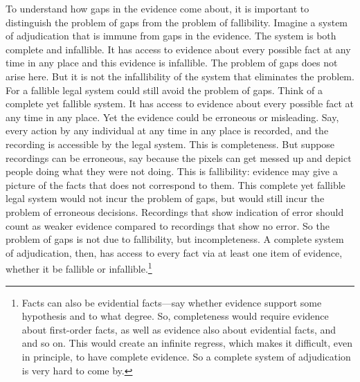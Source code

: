 \documentclass[
  10pt,
  dvipsnames,enabledeprecatedfontcommands]{scrartcl}
\begin{document}
To understand how gaps in the evidence come about, it is important to
distinguish the problem of gaps from the problem of fallibility. Imagine
a system of adjudication that is immune from gaps in the evidence. The
system is both complete and infallible. It has access to evidence about
every possible fact at any time in any place and this evidence is
infallible. The problem of gaps does not arise here. But it is not the
infallibility of the system that eliminates the problem. For a fallible
legal system could still avoid the problem of gaps. Think of a complete
yet fallible system. It has access to evidence about every possible fact
at any time in any place. Yet the evidence could be erroneous or
misleading. Say, every action by any individual at any time in any place
is recorded, and the recording is accessible by the legal system. This
is completeness. But suppose recordings can be erroneous, say because
the pixels can get messed up and depict people doing what they were not
doing. This is fallibility: evidence may give a picture of the facts
that does not correspond to them. This complete yet fallible legal
system would not incur the problem of gaps, but would still incur the
problem of erroneous decisions. Recordings that show indication of error
should count as weaker evidence compared to recordings that show no
error. So the problem of gaps is not due to fallibility, but
incompleteness. A complete system of adjudication, then, has access to
every fact via at least one item of evidence, whether it be fallible or
infallible.\footnote{Facts can also be evidential facts---say whether
  evidence support some hypothesis and to what degree. So, completeness
  would require evidence about first-order facts, as well as evidence
  also about evidential facts, and and so on. This would create an
  infinite regress, which makes it difficult, even in principle, to have
  complete evidence. So a complete system of adjudication is very hard
  to come by.}
\end{document}
